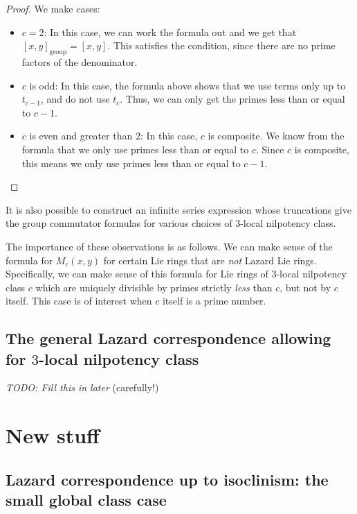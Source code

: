 \begin{proof}
  We make cases:

  \begin{itemize}
  \item $c = 2$: In this case, we can work the formula out and we get
    that $[x,y]_{\text{group}} = [x,y]$. This satisfies the condition,
    since there are no prime factors of the denominator.
  \item $c$ is odd: In this case, the formula above shows that we use
    terms only up to $t_{c - 1}$, and do not use $t_c$. Thus, we can
    only get the primes less than or equal to $c - 1$.
  \item $c$ is even and greater than $2$: In this case, $c$ is
    composite. We know from the formula that we only use primes less
    than or equal to $c$. Since $c$ is composite, this means we only
    use primes less than or equal to $c - 1$.
  \end{itemize}
\end{proof}

It is also possible to construct an infinite series expression whose
truncations give the group commutator formulas for various choices of
$3$-local nilpotency class.

The importance of these observations is as follows. We can make sense
of the formula for $M_c(x,y)$ for certain Lie rings that are {\em not}
Lazard Lie rings. Specifically, we can make sense of this formula for
Lie rings of $3$-local nilpotency class $c$ which are uniquely
divisible by primes strictly {\em less} than $c$, but not by $c$
itself. This case is of interest when $c$ itself is a prime number.

\subsection{The general Lazard correspondence allowing for $3$-local nilpotency class}

{\em TODO: Fill this in later} (carefully!)

\section{New stuff}

\subsection{Lazard correspondence up to isoclinism: the small global class case}

